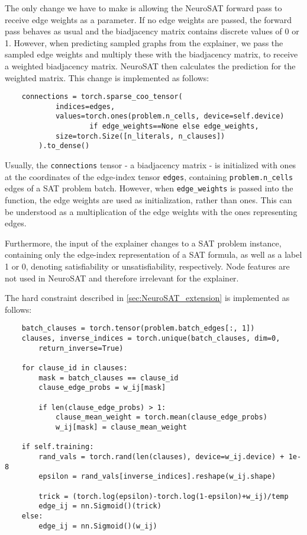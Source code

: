 The only change we have to make is allowing the NeuroSAT forward pass to receive edge weights as a parameter. If no edge weights are passed, the forward pass behaves as usual and the biadjacency matrix contains discrete values of 0 or 1. However, when predicting sampled graphs from the explainer, we pass the sampled edge weights and multiply these with the biadjacency matrix, to receive a weighted biadjacency matrix. NeuroSAT then calculates the prediction for the weighted matrix. This change is implemented as follows:
\begin{verbatim}
    connections = torch.sparse_coo_tensor(
            indices=edges,
            values=torch.ones(problem.n_cells, device=self.device) 
                    if edge_weights==None else edge_weights,
            size=torch.Size([n_literals, n_clauses])
        ).to_dense()
\end{verbatim}
Usually, the \verb|connections| tensor - a biadjacency matrix - is initialized with ones at the coordinates of the edge-index tensor \verb|edges|, containing \verb|problem.n_cells| edges of a SAT problem batch. However, when \verb|edge_weights| is passed into the function, the edge weights are used as initialization, rather than ones. This can be understood as a multiplication of the edge weights with the ones representing edges.

Furthermore, the input of the explainer changes to a SAT problem instance, containing only the edge-index representation of a SAT formula, as well as a label 1 or 0, denoting satisfiability or unsatisfiability, respectively. Node features are not used in NeuroSAT and therefore irrelevant for the explainer.

The hard constraint described in \ref{sec:NeuroSAT_extension} is implemented as follows:
\begin{verbatim}
    batch_clauses = torch.tensor(problem.batch_edges[:, 1])
    clauses, inverse_indices = torch.unique(batch_clauses, dim=0, 
        return_inverse=True)

    for clause_id in clauses:
        mask = batch_clauses == clause_id
        clause_edge_probs = w_ij[mask]
        
        if len(clause_edge_probs) > 1:
            clause_mean_weight = torch.mean(clause_edge_probs)
            w_ij[mask] = clause_mean_weight

    if self.training:
        rand_vals = torch.rand(len(clauses), device=w_ij.device) + 1e-8
        epsilon = rand_vals[inverse_indices].reshape(w_ij.shape)
        
        trick = (torch.log(epsilon)-torch.log(1-epsilon)+w_ij)/temp
        edge_ij = nn.Sigmoid()(trick)    
    else:
        edge_ij = nn.Sigmoid()(w_ij)
\end{verbatim}

